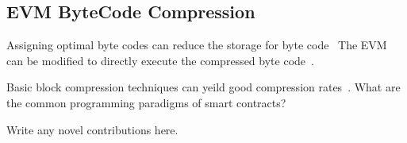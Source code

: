 
\subsection{EVM ByteCode Compression}\label{sec:evmcompress}

Assigning optimal byte codes can reduce the storage for byte code~\cite{aslam2010}
The EVM can be modified to directly execute the compressed byte code~\citet{marc2003}.

Basic block compression techniques can yeild good compression rates~\cite{clausen2000}.
What are the common programming paradigms of smart contracts?

Write any novel contributions here.

